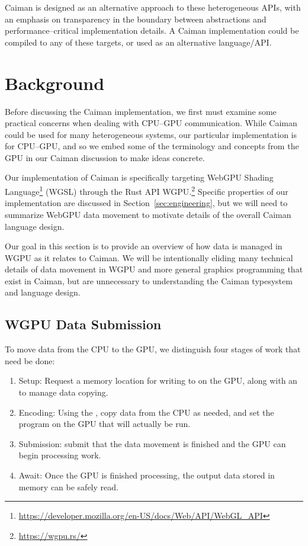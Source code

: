 Caiman is designed as an alternative approach to these heterogeneous APIs, with an emphasis on transparency in the boundary between abstractions and performance--critical implementation details.  A Caiman implementation could be compiled to any of these targets, or used as an alternative language/API.

\section{Background}
\label{sec:background}

Before discussing the Caiman implementation, we first must examine some practical concerns when dealing with CPU--GPU communication.  While Caiman could be used for many heterogeneous systems, our particular implementation is for CPU--GPU, and so we embed some of the terminology and concepts from the GPU in our Caiman discussion to make ideas concrete.

Our implementation of Caiman is specifically targeting WebGPU Shading Language\footnote{\url{https://developer.mozilla.org/en-US/docs/Web/API/WebGL_API}} (WGSL) through the Rust API WGPU.\footnote{\url{https://wgpu.rs/}}  Specific properties of our implementation are discussed in Section~\ref{sec:engineering}, but we will need to summarize WebGPU data movement to motivate details of the overall Caiman language design.

Our goal in this section is to provide an overview of how data is managed in WGPU as it relates to Caiman.  We will be intentionally eliding many technical details of data movement in WGPU and more general graphics programming that exist in Caiman, but are unnecessary to understanding the Caiman typesystem and language design.

\subsection{WGPU Data Submission}
\label{subsec:promise}

To move data from the CPU to the GPU, we distinguish four stages of work that need be done:

\begin{enumerate}
\item Setup: Request a memory location for writing to on the GPU, along with an  to manage data copying.
\item Encoding: Using the , copy data from the CPU as needed, and set the program on the GPU that will actually be run.
\item Submission: submit that the data movement is finished and the GPU can begin processing work.
\item Await: Once the GPU is finished processing, the output data stored in memory can be safely read.
\end{enumerate}

